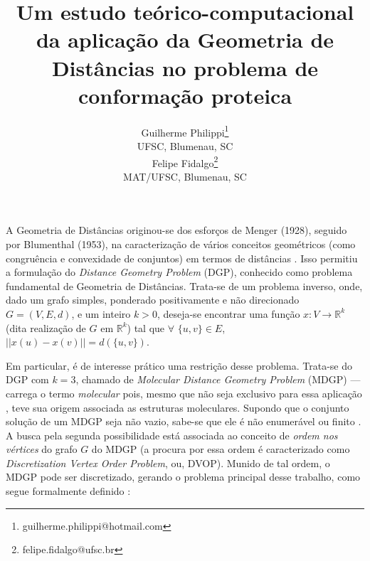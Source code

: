 \documentclass[a4,11pt]{pssbmac}
\begin{document}
	
	\title{Um estudo teórico-computacional da aplicação da Geometria de Distâncias no problema de conformação proteica}
	
	\author{
		{\large Guilherme Philippi}\thanks{guilherme.philippi@hotmail.com}\\
		{\small UFSC, Blumenau, SC} \\
		{\large Felipe Fidalgo}\thanks{felipe.fidalgo@ufsc.br} \\
		{\small MAT/UFSC, Blumenau, SC} \\
	}
	\criartitulo
	
	A Geometria de Distâncias originou-se dos esforços de Menger (1928), seguido por Blumenthal (1953), na caracterização de vários conceitos geométricos (como congruência e convexidade de conjuntos) em termos de distâncias \cite{carlileGDandAplications}. Isso permitiu a formulação do \textit{Distance Geometry Problem} (DGP), conhecido como problema fundamental de Geometria de Distâncias. Trata-se de um problema inverso, onde, dado um grafo simples, ponderado positivamente e não direcionado $G=(V,E, d)$, e um inteiro $k>0$, deseja-se encontrar uma função $x:V\rightarrow\mathbb{R}^k$ (dita realização de $G$ em $\mathbb{R}^k$) tal que $\forall$ $\{u,v\} \in E$, $||x(u) - x(v)|| = d(\{u,v\})$. 
	
	Em particular, é de interesse prático uma restrição desse problema. Trata-se do DGP com $k = 3$, chamado de \textit{Molecular Distance Geometry Problem} (MDGP) --- carrega o termo \textit{molecular} pois, mesmo que não seja exclusivo para essa aplicação \cite{carlileGDandAplications}, teve sua origem associada as estruturas moleculares. Supondo que o conjunto solução de um MDGP seja não vazio, sabe-se que ele é não enumerável ou finito \cite{carlileBook31Coloquio}. A busca pela segunda possibilidade está associada ao conceito de \textit{ordem nos vértices} do grafo $G$ do MDGP (a procura por essa ordem é caracterizado como \textit{Discretization Vertex Order Problem}, ou, DVOP). Munido de tal ordem, o MDGP pode ser discretizado, gerando o problema principal desse trabalho, como segue formalmente definido \cite{carlileBook31Coloquio} \cite{carlileDMDGP}:
	\\
	
\end{document}
